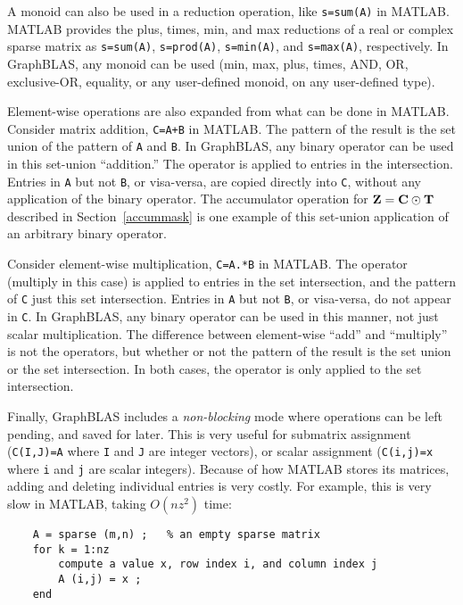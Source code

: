 \documentclass[12pt]{article}
\begin{document}
A monoid can also be used in a reduction operation, like \verb's=sum(A)' in
MATLAB.  MATLAB provides the plus, times, min, and max reductions of a real or
complex sparse matrix as \verb's=sum(A)',  \verb's=prod(A)', \verb's=min(A)',
and \verb's=max(A)', respectively.  In GraphBLAS, any monoid can be used (min,
max, plus, times, AND, OR, exclusive-OR, equality, or any user-defined monoid,
on any user-defined type).

Element-wise operations are also expanded from what can be done in MATLAB.
Consider matrix addition, \verb'C=A+B' in MATLAB.  The pattern of the result is
the set union of the pattern of \verb'A' and \verb'B'.  In GraphBLAS, any
binary operator can be used in this set-union ``addition.''  The operator is
applied to entries in the intersection.  Entries in \verb'A' but not \verb'B',
or visa-versa, are copied directly into \verb'C', without any application of
the binary operator.  The accumulator operation for ${\bf Z = C \odot T}$
described in Section~\ref{accummask} is one example of this set-union
application of an arbitrary binary operator.

Consider element-wise multiplication, \verb'C=A.*B' in MATLAB.  The operator
(multiply in this case) is applied to entries in the set intersection, and the
pattern of \verb'C' just this set intersection.  Entries in \verb'A' but not
\verb'B', or visa-versa, do not appear in \verb'C'.  In GraphBLAS, any binary
operator can be used in this manner, not just scalar multiplication.  The
difference between element-wise ``add'' and ``multiply'' is not the operators,
but whether or not the pattern of the result is the set union or the set
intersection.  In both cases, the operator is only applied to the set
intersection.

Finally, GraphBLAS includes a {\em non-blocking} mode where operations can be
left pending, and saved for later.  This is very useful for submatrix
assignment (\verb'C(I,J)=A' where \verb'I' and \verb'J' are integer vectors),
or scalar assignment (\verb'C(i,j)=x' where \verb'i' and \verb'j' are scalar
integers).  Because of how MATLAB stores its matrices, adding and deleting
individual entries is very costly.  For example, this is very slow in MATLAB,
taking $O(nz^2)$ time:

    \begin{mdframed}
    {\footnotesize
    \begin{verbatim}
    A = sparse (m,n) ;   % an empty sparse matrix
    for k = 1:nz
        compute a value x, row index i, and column index j
        A (i,j) = x ;
    end\end{verbatim}}\end{mdframed}
\end{document}
